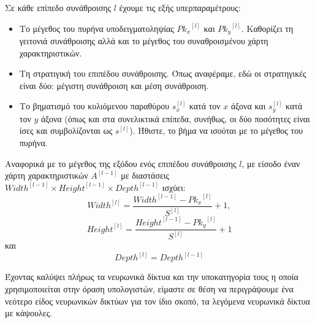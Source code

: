 Σε κάθε επίπεδο συνάθροισης $l$ έχουμε τις εξής υπερπαραμέτρους:
\begin{itemize}
  \item Το μέγεθος του πυρήνα υποδειγματοληψίας ${Pk_x}^{[l]}$ και ${Pk_y}^{[l]}$. Καθορίζει τη γειτονιά συνάθροισης αλλά και το μέγεθος του συναθροισμένου χάρτη χαρακτηριστικών.
  \item Τη στρατιγική του επιπέδου συνάθροισης. Όπως αναφέραμε, εδώ οι στρατηγικές είναι δύο: μέγιστη συνάθροιση και μέση συνάθροιση.
  \item Το βηματισμό του κυλιόμενου παραθύρου $s^{[l]}_x$ κατά τον $x$ άξονα και $s^{[l]}_y$ κατά τον $y$ άξονα (όπως και στα συνελικτικά επίπεδα, συνήθως, οι δύο ποσότητες είναι ίσες και συμβολίζονται ως $s^{[l]}$). Ήθιστε, το βήμα να ισούται με το μέγεθος του πυρήνα.
\end{itemize}

Αναφορικά με το μέγεθος της εξόδου ενός επιπέδου συνάθροισης $l$, με είσοδο έναν χάρτη χαρακτηριστικών $A^{[l-1]}$ με διαστάσεις ${Width}^{[l-1]} \times {Height}^{[l-1]}\times{Depth}^{[l-1]}$ ισχύει:
\begin{equation}
  {Width}^{[l]}= \frac{{Width}^{[l-1]}-{Pk_x}^{[l]}}{S^{[l]}} + 1,
  \end{equation}
  \begin{equation}
    {Height}^{[l]}=\frac{{Height}^{[l-1]}-{Pk_y}^{[l]}}{S^{[l]}} + 1
  \end{equation}
  και
  \begin{equation}
    {Depth}^{[l]}={Depth}^{[l-1]}
  \end{equation}

Έχοντας καλύψει πλήρως τα νευρωνικά δίκτυα και την υποκατηγορία τους η οποία χρησιμοποιείται στην όραση υπολογιστών, είμαστε σε θέση να περιγράψουμε ένα νεότερο είδος νευρωνικών δικτύων για τον ίδιο σκοπό, τα λεγόμενα νευρωνικά δίκτυα με κάψουλες.


